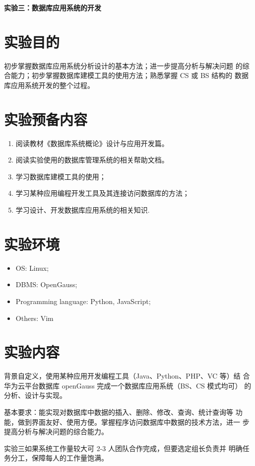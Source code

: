 \begin{center}
\textbf{实验三：数据库应用系统的开发}
\end{center}

\section{实验目的}
初步掌握数据库应用系统分析设计的基本方法；进一步提高分析与解决问题
的综合能力；初步掌握数据库建模工具的使用方法；熟悉掌握 CS 或 BS 结构的
数据库应用系统开发的整个过程。

\section{实验预备内容}
\begin{enumerate}
  \item 阅读教材《数据库系统概论》设计与应用开发篇。
  \item 阅读实验使用的数据库管理系统的相关帮助文档。
  \item 学习数据库建模工具的使用；
  \item 学习某种应用编程开发工具及其连接访问数据库的方法；
  \item 学习设计、开发数据库应用系统的相关知识.
\end{enumerate}

\section{实验环境}
\begin{itemize}
  \item OS: Linux;
  \item DBMS: OpenGauss;
  \item Programming language: Python, JavaScript;
  \item Others: Vim
\end{itemize}

\section{实验内容}

背景自定义，使用某种应用开发编程工具（Java、Python、PHP、VC 等）结
合华为云平台数据库 openGauss 完成一个数据库应用系统（BS、CS 模式均可）
的分析、设计与实现。

基本要求：能实现对数据库中数据的插入、删除、修改、查询、统计查询等
功能，做到界面友好、使用方便。掌握程序访问数据库中数据的技术方法，进一
步提高分析与解决问题的综合能力。

实验三如果系统工作量较大可 2-3 人团队合作完成，但要选定组长负责并
明确任务分工，保障每人的工作量饱满。

